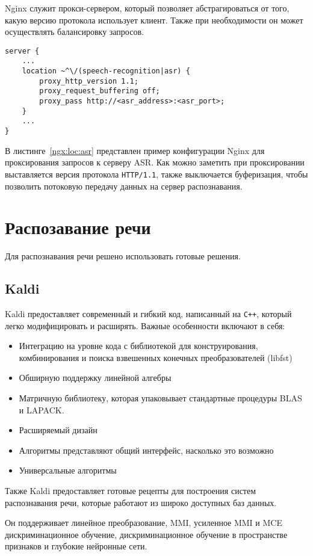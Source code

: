 Nginx служит прокси-сервером, который позволяет абстрагироваться от того, какую
версию протокола использует клиент. Также при необходимости он может осуществлять
балансировку запросов.
\begin{lstlisting}[caption={Пример конфигурации Nginx}, label={ngx:loc:asr}]
server {
    ...
    location ~^\/(speech-recognition|asr) {
        proxy_http_version 1.1;
        proxy_request_buffering off;
        proxy_pass http://<asr_address>:<asr_port>;
    }
    ...
}
\end{lstlisting}

В листинге~\ref{ngx:loc:asr} представлен пример конфигурации Nginx для проксирования
запросов к серверу ASR. Как можно заметить при проксировании выставляется
версия протокола \texttt{HTTP/1.1}, также выключается буферизация, чтобы позволить
потоковую передачу данных на сервер распознавания.


\section{Распозавание речи}
Для распознавания речи решено использовать готовые решения.
\subsection{Kaldi}
Kaldi предоставляет современный и гибкий код, написанный на \texttt{C++}, который
легко модифицировать и расширять. Важные особенности включают в себя:

\begin{itemize}
    \item Интеграцию на уровне кода с библиотекой для конструирования, комбинирования
        и поиска взвешенных конечных преобразователей (libfst)
    \item Обширную поддержку линейной алгебры
    \item Матричную библиотеку, которая упаковывает стандартные процедуры BLAS и LAPACK.
    \item Расширяемый дизайн
    \item Алгоритмы представляют общий интерфейс, насколько это возможно
    \item Универсальные алгоритмы
\end{itemize}

Также Kaldi предоставляет готовые рецепты для построения систем распознавания речи,
которые работают из широко доступных баз данных.

Он поддерживает линейное преобразование, MMI,
усиленное MMI и MCE дискриминационное обучение, дискриминационное обучение в
пространстве признаков и глубокие нейронные сети.

